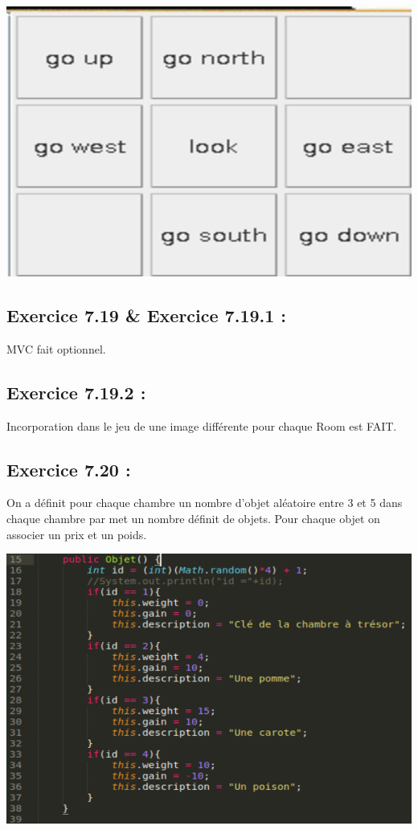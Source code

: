 \documentclass[french,10pt,a4paper]{report}
\begin{document}
\begin{center}
\begin{minipage}{0.4\textwidth}
	\begin{center}
		\includegraphics[scale=0.2]{captures/it2_5.png}
	\end{center}
\end{minipage}
\end{center}

\subsection{\textcolor{bb}{Exercice 7.19 \& Exercice 7.19.1 :}}
MVC fait optionnel.

\subsection{\textcolor{bb}{Exercice 7.19.2 :}}
Incorporation dans le jeu de une image différente pour chaque Room est FAIT.

\subsection{\textcolor{bb}{Exercice 7.20 :}}
On a définit pour chaque chambre un nombre d’objet aléatoire entre 3 et 5 dans chaque chambre par met un nombre définit de objets. Pour chaque objet  on associer un prix et un poids.
\begin{center}
	\includegraphics[scale=0.4]{captures/it2_6.png}
\end{center}
\end{document}

